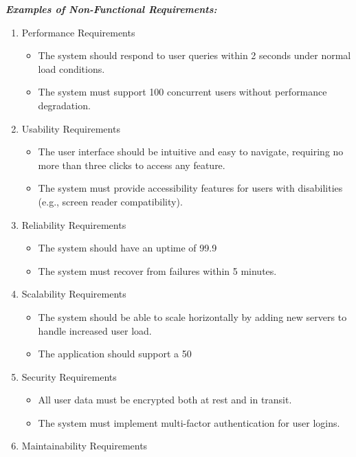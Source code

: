 \documentclass[a4paper]{article}
\begin{document}
\vspace{0.5 cm}
\textbf{\textit{Examples of Non-Functional Requirements:}}

\begin{enumerate}
        \item Performance Requirements
\begin{itemize}
        \item The system should respond to user queries within 2 seconds under normal load conditions.
        \item The system must support 100 concurrent users without performance degradation.
\end{itemize}
        \item Usability Requirements

\begin{itemize}
        \item The user interface should be intuitive and easy to navigate, requiring no more than three clicks to access any feature.
        \item The system must provide accessibility features for users with disabilities (e.g., screen reader compatibility).
\end{itemize}
        \item Reliability Requirements

\begin{itemize}
        \item The system should have an uptime of 99.9%
        \item The system must recover from failures within 5 minutes.
\end{itemize}
        \item Scalability Requirements

\begin{itemize}
        \item The system should be able to scale horizontally by adding new servers to handle increased user load.
        \item The application should support a 50%
\end{itemize}
        \item Security Requirements
\begin{itemize}

        \item All user data must be encrypted both at rest and in transit.
        \item The system must implement multi-factor authentication for user logins.
\end{itemize}
        \item Maintainability Requirements


\end{enumerate}
\end{document}
